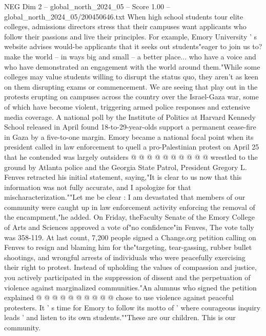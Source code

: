 \begin{textsample}{NEG Dim 2 – global\_north\_2024\_05 – Score 1.00 – global\_north\_2024\_05/200450646.txt}  \label{ex:f2_neg_156}
When high school students tour elite colleges, admissions directors stress that their campuses want applicants who follow their passions and live their principles.
For example, Emory University ' s website advises would-be applicants that it seeks out students"eager to join us to? make the world -- in ways big and small -- a better place... who have a voice and who have demonstrated an engagement with the world around them."While some colleges may value students willing to disrupt the status quo, they aren't as keen on them disrupting exams or commencement.
We are seeing that play out in the protests erupting on campuses across the country over the Israel-Gaza war, some of which have become violent, triggering armed police responses and extensive media coverage.
A national poll by the Institute of Politics at Harvard Kennedy School released in April found 18-to-29-year-olds support a permanent cease-fire in Gaza by a five-to-one margin.
Emory became a national focal point when its president called in law enforcement to quell a pro-Palestinian protest on April 25 that he contended was largely outsiders @ @ @ @ @ @ @ @ @ @ wrestled to the ground by Atlanta police and the Georgia State Patrol, President Gregory L.
Fenves retracted his initial statement, saying,"It is clear to us now that this information was not fully accurate, and I apologize for that mischaracterization.""Let me be clear : I am devastated that members of our community were caught up in law enforcement activity enforcing the removal of the encampment,"he added.
On Friday, theFaculty Senate of the Emory College of Arts and Sciences approved a vote of"no confidence"in Fenves, The vote tally was 358-119.
At last count, 7,200 people signed a Change.org petition calling on Fenves to resign and blaming him for the"targeting, tear-gassing, rubber bullet shootings, and wrongful arrests of individuals who were peacefully exercising their right to protest.
Instead of upholding the values of compassion and justice, you actively participated in the suppression of dissent and the perpetuation of violence against marginalized communities."An alumnus who signed the petition explained @ @ @ @ @ @ @ @ @ @ chose to use violence against peaceful protesters.
It ' s time for Emory to follow its motto of ' where courageous inquiry leads ' and listen to its own students.""These are our children.
This is our community.

\end{textsample}
